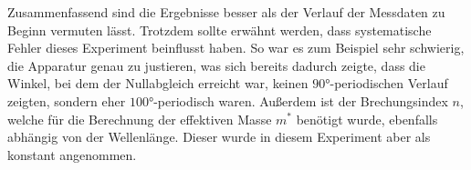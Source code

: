 Zusammenfassend sind die Ergebnisse besser als der Verlauf der Messdaten zu Beginn vermuten lässt. Trotzdem sollte erwähnt werden, dass systematische Fehler dieses Experiment beinflusst haben. So war es zum Beispiel sehr schwierig, die Apparatur genau zu justieren, was sich bereits dadurch zeigte, dass die Winkel, bei dem der
Nullabgleich erreicht war, keinen $90°$-periodischen Verlauf zeigten, sondern eher $100°$-periodisch waren. Außerdem ist der Brechungsindex $n$, welche für die Berechnung der effektiven Masse $m^{*}$ benötigt wurde, ebenfalls abhängig von der Wellenlänge. Dieser wurde in diesem Experiment aber als konstant angenommen.

\nocite{wingate}
\nocite{*}
\printbibliography

